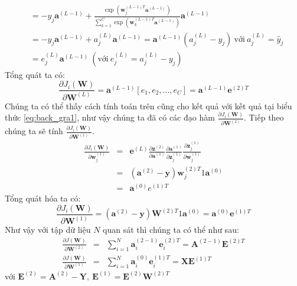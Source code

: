 \begin{enumerate}
\begin{equation*}
\begin{split}
&=-y_{j}\textbf{a}^{(L-1)} + 
\frac{\exp(\textbf{w}_j^{(L-1)T}\textbf{a}^{(L-1)})}{\sum_{k = 1}^C \exp(\textbf{w}_k^{(L-1)T}\textbf{a}^{(L-1)})}\textbf{a}^{(L-1)} \\
&= -y_{j}\textbf{a}^{(L-1)} + a^{(L)}_{j} \textbf{a}^{(L-1)}= \textbf{a}^{(L-1)} (a^{(L)}_{j} - y_{j})~ \text{với} ~a_j^{(L)} = \widehat{y}_j \\
&= e^{(L)}_{j}\textbf{a}^{(L-1)} ~(\text{với}~ e^{(L)}_{j} = a^{(L)}_{j} - y_{j})
\end{split}
\end{equation*} 
Tổng quát ta có:
\begin{equation}
\frac{\partial J_i(\textbf{W})}{\partial \textbf{W}^{(L)}} = \textbf{a}^{(L-1)}[e_1,e_2,\ldots,e_C]=\textbf{a}^{(L-1)}\textbf{e}^{(2)T}
\end{equation}
Chúng ta có thể thấy cách tính toán trên cũng cho kết quả với kết quả tại biểu thức \ref{eq:back_gra1}, như vậy chúng ta đã có các đạo hàm $\frac{\partial J_i(\textbf{W})}{\partial \textbf{W}^{(2)}}$. Tiếp theo chúng ta sẽ tính $\frac{\partial J_i(\textbf{W})}{\partial \textbf{W}^{(1)}}$.
\begin{eqnarray*}
\frac{\partial J_i(\textbf{W})}{\partial \textbf{w}^{(1)}_j} &=& \textbf{e}^{(L)}\frac{\partial\textbf{z}^{(2)}}{\partial \textbf{a}^{(1)}} \frac{\partial \textbf{a}^{(1)}}{\partial \textbf{z}^{(1)}_j} \frac{\partial \textbf{z}^{(1)}_j}{\partial \textbf{w}^{(1)}_j}  \\
&=&(\textbf{a}^{(2)}-\textbf{y})\textbf{w}^{(2)T}_j 1\textbf{a}^{(0)}\\
&=&\textbf{a}^{(0)}e^{(1)T}
\end{eqnarray*}
Tổng quát hóa ta có:
\begin{equation}
\frac{\partial J_i(\textbf{W})}{\partial \textbf{W}^{(1)}} = (\textbf{a}^{(2)}-\textbf{y})\textbf{W}^{(2)T} 1 \textbf{a}^{(0)} = \textbf{a}^{(0)}\textbf{e}^{(1)T}
\end{equation}
Như vậy với tập dữ liệu $N$ quan sát thì chúng ta có thể như sau:
\begin{eqnarray}
\frac{\partial J(\textbf{W})}{\partial \textbf{W}^{(2)}} &=&\sum^{N}_{i=1} \textbf{a}^{(2-1)}_i\textbf{e}^{(2)T}_i = \textbf{A}^{(2-1)}\textbf{E}^{(2)T}\\
\frac{\partial J(\textbf{W})}{\partial \textbf{W}^{(1)}} &=& \sum^{N}_{i=1} \textbf{a}^{(0)}_i \textbf{e}^{(1)T}_i = \textbf{X}\textbf{E}^{(1)T}
\end{eqnarray}
với $\textbf{E}^{(2)} = \textbf{A}^{(2)}-\textbf{Y}, ~ \textbf{E}^{(1)} = \textbf{E}^{(2)}\textbf{W}^{(2)T}$

\end{enumerate}
